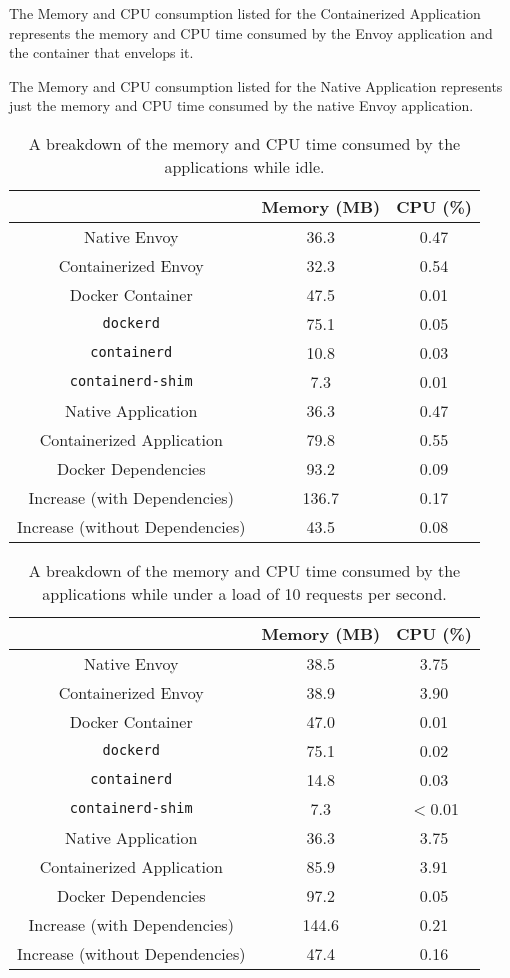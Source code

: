 \documentclass{article}
\begin{document}
The Memory and CPU consumption listed for the Containerized Application represents the memory and CPU time consumed by the Envoy application and the container that envelops it.

The Memory and CPU consumption listed for the Native Application represents just the memory and CPU time consumed by the native Envoy application.

\begin{table}[H]
\begin{tabular}{ |c|c|c| }
 \hline
   & Memory (MB) & CPU (\%) \\ 
 \hline
 Native Envoy & 36.3 & 0.47 \\
 \hline
 Containerized Envoy & 32.3 & 0.54 \\
 \hline
 Docker Container & 47.5 & 0.01 \\
 \hline
 \texttt{dockerd} & 75.1 & 0.05 \\
 \hline
 \texttt{containerd} & 10.8 & 0.03 \\
 \hline
 \texttt{containerd-shim} & 7.3 & 0.01 \\
 \hline\hline
 Native Application & 36.3 & 0.47 \\
 \hline
 Containerized Application & 79.8 & 0.55 \\
 \hline
 Docker Dependencies & 93.2 & 0.09 \\
 \hline\hline
 Increase (with Dependencies) & 136.7 & 0.17 \\
 \hline
 Increase (without Dependencies) & 43.5 & 0.08 \\
 \hline
\end{tabular}
\caption{A breakdown of the memory and CPU time consumed by the applications while idle.}
\label{idle-consumption-breakdown}
\end{table}

\begin{table}[H]
\begin{tabular}{ |c|c|c| }
 \hline
   & Memory (MB) & CPU (\%) \\ 
 \hline
 Native Envoy & 38.5 & 3.75 \\
 \hline
 Containerized Envoy & 38.9 & 3.90 \\
 \hline
 Docker Container & 47.0 & 0.01 \\
 \hline
 \texttt{dockerd} & 75.1 & 0.02 \\
 \hline
 \texttt{containerd} & 14.8 & 0.03 \\
 \hline
 \texttt{containerd-shim} & 7.3 & $<$0.01 \\
 \hline\hline
 Native Application & 36.3 & 3.75 \\
 \hline
 Containerized Application & 85.9 & 3.91 \\
 \hline
 Docker Dependencies & 97.2 & 0.05 \\
 \hline\hline
 Increase (with Dependencies) & 144.6 & 0.21 \\
 \hline
 Increase (without Dependencies) & 47.4 & 0.16 \\
 \hline
\end{tabular}
\caption{A breakdown of the memory and CPU time consumed by the applications while under a load of 10 requests per second.}
\label{consumption-breakdown-under-load-10}
\end{table}
\end{document}
